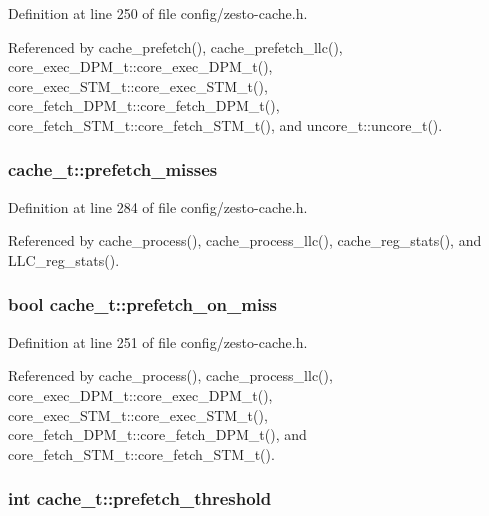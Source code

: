 Definition at line 250 of file config/zesto-cache.h.

Referenced by cache\_\-prefetch(), cache\_\-prefetch\_\-llc(), core\_\-exec\_\-DPM\_\-t::core\_\-exec\_\-DPM\_\-t(), core\_\-exec\_\-STM\_\-t::core\_\-exec\_\-STM\_\-t(), core\_\-fetch\_\-DPM\_\-t::core\_\-fetch\_\-DPM\_\-t(), core\_\-fetch\_\-STM\_\-t::core\_\-fetch\_\-STM\_\-t(), and uncore\_\-t::uncore\_\-t().
\subsubsection[{prefetch\_\-misses}]{ {\bf cache\_\-t::prefetch\_\-misses}}\label{structcache__t_478a99eea7789f5163d249af41633de8}




Definition at line 284 of file config/zesto-cache.h.

Referenced by cache\_\-process(), cache\_\-process\_\-llc(), cache\_\-reg\_\-stats(), and LLC\_\-reg\_\-stats().
\subsubsection[{prefetch\_\-on\_\-miss}]{\setlength{\rightskip}{0pt plus 5cm}bool {\bf cache\_\-t::prefetch\_\-on\_\-miss}}\label{structcache__t_c9dbdd85b01ac41d232da64808bf70e5}




Definition at line 251 of file config/zesto-cache.h.

Referenced by cache\_\-process(), cache\_\-process\_\-llc(), core\_\-exec\_\-DPM\_\-t::core\_\-exec\_\-DPM\_\-t(), core\_\-exec\_\-STM\_\-t::core\_\-exec\_\-STM\_\-t(), core\_\-fetch\_\-DPM\_\-t::core\_\-fetch\_\-DPM\_\-t(), and core\_\-fetch\_\-STM\_\-t::core\_\-fetch\_\-STM\_\-t().
\subsubsection[{prefetch\_\-threshold}]{\setlength{\rightskip}{0pt plus 5cm}int {\bf cache\_\-t::prefetch\_\-threshold}}\label{structcache__t_e7e8e385030eeff779f3286a13294045}




